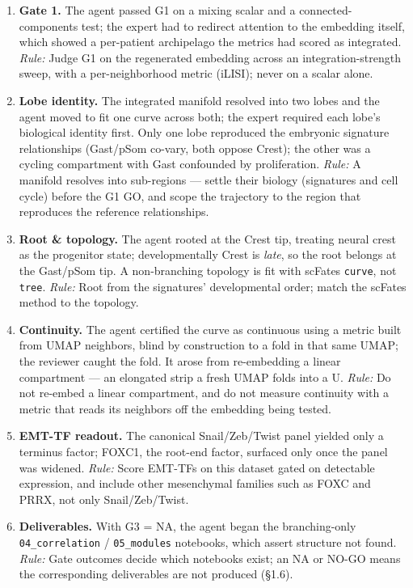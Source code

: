 \documentclass[11pt,a4paper]{article}
\begin{document}
\begin{enumerate}
\def\labelenumi{\arabic{enumi}.}
\item
  \textbf{Gate 1.} The agent passed G1 on a mixing scalar and a
  connected-components test; the expert had to redirect attention to the
  embedding itself, which showed a per-patient archipelago the metrics
  had scored as integrated. \emph{Rule:} Judge G1 on the regenerated
  embedding across an integration-strength sweep, with a
  per-neighborhood metric (iLISI); never on a scalar alone.
\item
  \textbf{Lobe identity.} The integrated manifold resolved into two
  lobes and the agent moved to fit one curve across both; the expert
  required each lobe's biological identity first. Only one lobe
  reproduced the embryonic signature relationships (Gast/pSom co-vary,
  both oppose Crest); the other was a cycling compartment with Gast
  confounded by proliferation. \emph{Rule:} A manifold resolves into
  sub-regions --- settle their biology (signatures and cell cycle)
  before the G1 GO, and scope the trajectory to the region that
  reproduces the reference relationships.
\item
  \textbf{Root \& topology.} The agent rooted at the Crest tip, treating
  neural crest as the progenitor state; developmentally Crest is
  \emph{late}, so the root belongs at the Gast/pSom tip. A non-branching
  topology is fit with scFates \texttt{curve}, not \texttt{tree}.
  \emph{Rule:} Root from the signatures' developmental order; match the
  scFates method to the topology.
\item
  \textbf{Continuity.} The agent certified the curve as continuous using
  a metric built from UMAP neighbors, blind by construction to a fold in
  that same UMAP; the reviewer caught the fold. It arose from
  re-embedding a linear compartment --- an elongated strip a fresh UMAP
  folds into a U. \emph{Rule:} Do not re-embed a linear compartment, and
  do not measure continuity with a metric that reads its neighbors off
  the embedding being tested.
\item
  \textbf{EMT-TF readout.} The canonical Snail/Zeb/Twist panel yielded
  only a terminus factor; FOXC1, the root-end factor, surfaced only once
  the panel was widened. \emph{Rule:} Score EMT-TFs on this dataset
  gated on detectable expression, and include other mesenchymal families
  such as FOXC and PRRX, not only Snail/Zeb/Twist.
\item
  \textbf{Deliverables.} With G3 = NA, the agent began the
  branching-only \texttt{04\_correlation} / \texttt{05\_modules}
  notebooks, which assert structure not found. \emph{Rule:} Gate
  outcomes decide which notebooks exist; an NA or NO-GO means the
  corresponding deliverables are not produced (§1.6).
\end{enumerate}
\end{document}
